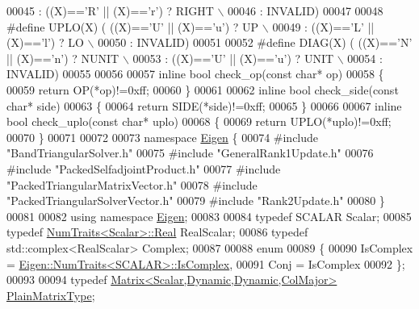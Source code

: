 \begin{DoxyCode}
00045 \textcolor{preprocessor}{                  : ((X)=='R' || (X)=='r') ? RIGHT  \(\backslash\)}
00046 \textcolor{preprocessor}{                  : INVALID)}
00047 
00048 \textcolor{preprocessor}{#define UPLO(X) (   ((X)=='U' || (X)=='u') ? UP     \(\backslash\)}
00049 \textcolor{preprocessor}{                  : ((X)=='L' || (X)=='l') ? LO     \(\backslash\)}
00050 \textcolor{preprocessor}{                  : INVALID)}
00051 
00052 \textcolor{preprocessor}{#define DIAG(X) (   ((X)=='N' || (X)=='n') ? NUNIT  \(\backslash\)}
00053 \textcolor{preprocessor}{                  : ((X)=='U' || (X)=='u') ? UNIT   \(\backslash\)}
00054 \textcolor{preprocessor}{                  : INVALID)}
00055 
00056 
00057 \textcolor{keyword}{inline} \textcolor{keywordtype}{bool} check\_op(\textcolor{keyword}{const} \textcolor{keywordtype}{char}* op)
00058 \{
00059   \textcolor{keywordflow}{return} OP(*op)!=0xff;
00060 \}
00061 
00062 \textcolor{keyword}{inline} \textcolor{keywordtype}{bool} check\_side(\textcolor{keyword}{const} \textcolor{keywordtype}{char}* side)
00063 \{
00064   \textcolor{keywordflow}{return} SIDE(*side)!=0xff;
00065 \}
00066 
00067 \textcolor{keyword}{inline} \textcolor{keywordtype}{bool} check\_uplo(\textcolor{keyword}{const} \textcolor{keywordtype}{char}* uplo)
00068 \{
00069   \textcolor{keywordflow}{return} UPLO(*uplo)!=0xff;
00070 \}
00071 
00072 
00073 \textcolor{keyword}{namespace }\hyperlink{namespace_eigen}{Eigen} \{
00074 \textcolor{preprocessor}{#include "BandTriangularSolver.h"}
00075 \textcolor{preprocessor}{#include "GeneralRank1Update.h"}
00076 \textcolor{preprocessor}{#include "PackedSelfadjointProduct.h"}
00077 \textcolor{preprocessor}{#include "PackedTriangularMatrixVector.h"}
00078 \textcolor{preprocessor}{#include "PackedTriangularSolverVector.h"}
00079 \textcolor{preprocessor}{#include "Rank2Update.h"}
00080 \}
00081 
00082 \textcolor{keyword}{using namespace }\hyperlink{namespace_eigen}{Eigen};
00083 
00084 \textcolor{keyword}{typedef} SCALAR Scalar;
00085 \textcolor{keyword}{typedef} \hyperlink{group___core___module_struct_eigen_1_1_num_traits}{NumTraits<Scalar>::Real} RealScalar;
00086 \textcolor{keyword}{typedef} std::complex<RealScalar> Complex;
00087 
00088 \textcolor{keyword}{enum}
00089 \{
00090   IsComplex = \hyperlink{group___core___module_struct_eigen_1_1_num_traits}{Eigen::NumTraits<SCALAR>::IsComplex},
00091   Conj = IsComplex
00092 \};
00093 
00094 \textcolor{keyword}{typedef} \hyperlink{group___core___module_class_eigen_1_1_matrix}{Matrix<Scalar,Dynamic,Dynamic,ColMajor>} 
      \hyperlink{group___core___module_class_eigen_1_1_matrix}{PlainMatrixType};

\end{DoxyCode}
